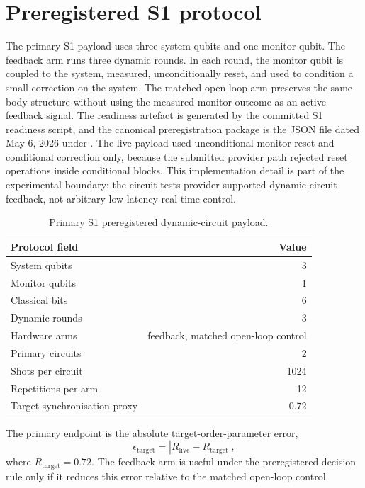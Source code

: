 \documentclass[preprint,aps,physrev,superscriptaddress,floatfix,longbibliography]{revtex4-2}
\begin{document}
\section{Preregistered S1 protocol}

The primary S1 payload uses three system qubits and one monitor qubit. The
feedback arm runs three dynamic rounds. In each round, the monitor qubit is
coupled to the system, measured, unconditionally reset, and used to condition a
small correction on the system. The matched open-loop arm preserves the same
body structure without using the measured monitor outcome as an active
feedback signal. The readiness artefact is generated by the committed S1
readiness script, and the canonical preregistration package is the JSON file
dated May 6, 2026 under .
The live payload used unconditional monitor reset and conditional correction
only, because the submitted provider path rejected reset operations inside
conditional blocks. This implementation detail is part of the experimental
boundary: the circuit tests provider-supported dynamic-circuit feedback, not
arbitrary low-latency real-time control.

\begin{table}[tb]
\centering
\begin{tabular}{lr}
\toprule
Protocol field & Value \\
\midrule
System qubits & 3 \\
Monitor qubits & 1 \\
Classical bits & 6 \\
Dynamic rounds & 3 \\
Hardware arms & feedback, matched open-loop control \\
Primary circuits & 2 \\
Shots per circuit & 1024 \\
Repetitions per arm & 12 \\
Target synchronisation proxy & 0.72 \\
\bottomrule
\end{tabular}
\caption{Primary S1 preregistered dynamic-circuit payload.}
\label{tab:protocol}
\end{table}

The primary endpoint is the absolute target-order-parameter error,
\begin{equation}
    \epsilon_{\mathrm{target}} = |R_{\mathrm{live}} - R_{\mathrm{target}}|,
\end{equation}
where $R_{\mathrm{target}}=0.72$. The feedback arm is useful under the
preregistered decision rule only if it reduces this error relative to the
matched open-loop control.
\end{document}
